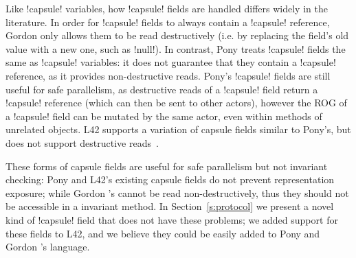 Like \Q!capsule! variables, how \Q!capsule! fields are handled differs widely in the literature. In order for \Q!capsule! fields to always contain a \Q!capsule! reference, Gordon \etal only allows them to be read destructively (i.e. by replacing the field's old value with a new one, such as \Q!null!). 
In contrast, Pony treats \Q!capsule! fields the same as \Q!capsule! variables: it does not guarantee that they contain a \Q!capsule! reference, as it provides non-destructive reads.
Pony's \Q!capsule! fields are still useful for safe parallelism, as destructive reads of a \Q!capsule! field return a \Q!capsule! reference (which can then be sent to other actors), however the ROG of a \Q!capsule! field can be mutated by the same actor, even within methods of unrelated objects.
L42 supports a variation of capsule fields similar to Pony's, but does not support destructive reads~\cite{ServettoEtAl13a,GIANNINI2019145}. 

These forms of capsule fields are useful for safe parallelism but not invariant checking: Pony and L42's existing capsule fields do not prevent representation exposure; while Gordon \etal's cannot be read non-destructively, thus they should not be accessible in a invariant method.
In Section~\ref{s:protocol} we present a novel kind of \Q!capsule! field that does not have these problems; we added support for these fields to L42, and we believe they could be easily added to Pony and Gordon \etal's language.


